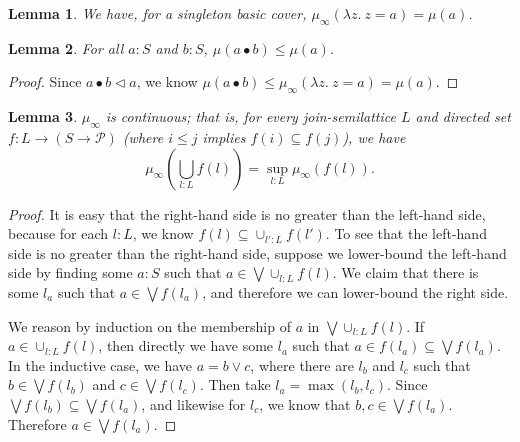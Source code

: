 \documentclass{article}           %
\newtheorem{lemma}{Lemma}
\newcommand{\cov}{\vartriangleleft}
\newcommand{\Prop}{\mathcal{P}}
\newcommand{\fun}[2]{\lambda {#1}.\  {#2}}
\begin{document}
\begin{lemma}
We have, for a singleton basic cover, $\mu_\infty(\fun{z}{z = a}) = \mu(a)$.
\end{lemma}

\begin{lemma}
For all $a : S$ and $b : S$, $\mu(a \bullet b) \le \mu(a)$.
\end{lemma}
\begin{proof}
Since $a \bullet b \cov a$, we know $\mu(a \bullet b) \le \mu_\infty(\fun{z}{z = a}) = \mu(a)$.
\end{proof}

\begin{lemma}
$\mu_\infty$ is continuous; that is, for every join-semilattice $L$ and directed set $f : L \to (S \to \Prop)$ (where $i \le j$ implies $f(i) \subseteq f(j)$), we have
\[
\mu_\infty\left(\bigcup_{l : L} f(l)\right) = \sup_{l : L} \mu_\infty(f(l)).
\]
\end{lemma}
\begin{proof}
It is easy that the right-hand side is no greater than the left-hand side, because for each $l : L$, we know $f(l) \subseteq \cup_{l' : L} f(l')$. To see that the left-hand side is no greater than the right-hand side, suppose we lower-bound the left-hand side by finding some $a : S$ such that $a \in \bigvee \cup_{l : L} f(l)$. We claim that there is some $l_a$ such that $a \in \bigvee f(l_a)$, and therefore we can lower-bound the right side. 

We reason by induction on the membership of $a$ in $\bigvee \cup_{l : L} f(l)$. If $a \in \cup_{l : L} f(l)$, then directly we have some $l_a$ such that $a \in f(l_a) \subseteq \bigvee f(l_a)$. In the inductive case, we have $a = b \vee c$, where there are $l_b$ and $l_c$ such that $b \in \bigvee f(l_b)$ and $c \in \bigvee f(l_c)$. Then take $l_a = \max(l_b, l_c)$. Since $\bigvee f(l_b) \subseteq \bigvee f(l_a)$, and likewise for $l_c$, we know that $b, c \in \bigvee f(l_a)$. Therefore $a \in \bigvee f(l_a)$.
\end{proof}
\end{document}
